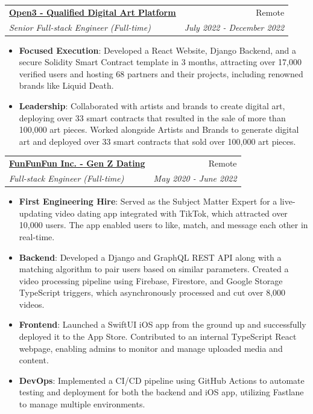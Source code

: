 \documentclass[a4paper,20pt]{article}
\makeatletter
\newcommand{\resumeItem}[2]{
  \item\small{
    \textbf{#1}{: #2 \vspace{-6pt}}
  }
}
\newcommand{\resumeSubheading}[4]{
  \vspace{-1pt}\item
    \begin{tabular*}{0.97\textwidth}{l@{\extracolsep{\fill}}r}
      \textbf{#1} & #2 \\
      \textit{#3} & \textit{#4} \\
    \end{tabular*}\vspace{-5pt}
}
\newcommand{\resumeItemListStart}{\begin{itemize}}
\newcommand{\resumeItemListEnd}{\end{itemize}\vspace{-3pt}}
\makeatother
\begin{document}
  \resumeSubheading{\underline{\href{http://open3.com}{Open3 - Qualified Digital Art Platform}}}{Remote}
    {Senior Full-stack Engineer (Full-time)}{July 2022 - December 2022}
    \resumeItemListStart
          \resumeItem{Focused Execution}
          {Developed a React Website, Django Backend, and a secure Solidity Smart Contract template in 3 months, attracting over 17,000 verified users and hosting 68 partners and their projects, including renowned brands like Liquid Death.}
          \resumeItem{Leadership}
          {Collaborated with artists and brands to create digital art, deploying over 33 smart contracts that resulted in the sale of more than 100,000 art pieces. Worked alongside Artists and Brands to generate digital art and deployed over 33 smart contracts that sold over 100,000 art pieces.}
          \resumeItemListEnd

          \resumeSubheading{\underline{\href{http://funfunfun.app}{FunFunFun Inc. - Gen Z Dating}}}{Remote}
    {Full-stack Engineer (Full-time)}{May 2020 - June 2022}
    \resumeItemListStart
        \resumeItem{First Engineering Hire}
          {Served as the Subject Matter Expert for a live-updating video dating app integrated with TikTok, which attracted over 10,000 users. The app enabled users to like, match, and message each other in real-time.}
          \resumeItem{Backend}
          {Developed a Django and GraphQL REST API along with a matching algorithm to pair users based on similar parameters. Created a video processing pipeline using Firebase, Firestore, and Google Storage TypeScript triggers, which asynchronously processed and cut over 8,000 videos.}
          \resumeItem{Frontend}
          {Launched a SwiftUI iOS app from the ground up and successfully deployed it to the App Store. Contributed to an internal TypeScript React webpage, enabling admins to monitor and manage uploaded media and content.}
          \resumeItem{DevOps}
          {Implemented a CI/CD pipeline using GitHub Actions to automate testing and deployment for both the backend and iOS app, utilizing Fastlane to manage multiple environments.}
      \resumeItemListEnd
\end{document}
